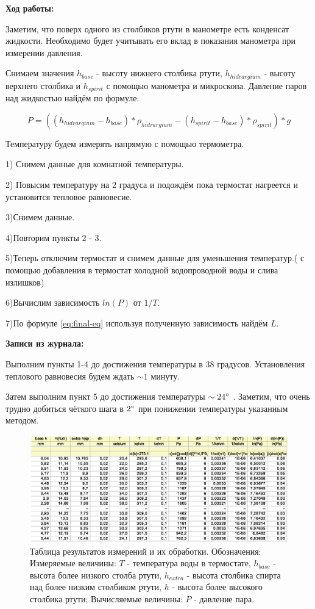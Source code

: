 \documentclass[a4paper,12pt]{article}
\begin{document}
\textbf{Ход работы:}
\bigskip

Заметим, что поверх одного из столбиков ртути в манометре есть конденсат жидкости. Необходимо будет учитывать его вклад в показания манометра при измерении давления.

Снимаем значения $h_{base}$ - высоту нижнего столбика ртути, $h_{hidrargium}$ - высоту верхнего столбика  и $h_{spirit}$ с помощью манометра и микроскопа. Давление паров над жидкостью найдём по формуле: 

\begin{equation}\label{eq:p-from-h}
P = ((h_{hidrargium} - h_{base})*\rho_{hidrargium} - (h_{spirit} - h_{base})*\rho_{spirit})*g
\end{equation}

Температуру будем измерять напрямую с помощью термометра.
\medskip

1) Снимем данные для комнатной температуры.

2) Повысим температуру на 2 градуса и подождём пока термостат нагреется и установится тепловое равновесие.

3)Снимем данные.

4)Повторим пункты 2 - 3.

5)Теперь отключим термостат и снимем данные для уменьшения температур.( с помощью добавления в термостат холодной водопроводной воды и слива излишков)

6)Вычислим зависимость $ln(P)$ от $1/T$.

7)По формуле \ref{eq:final-eq} используя полученную зависимость найдём $L$.
\bigskip

\textbf{Записи из журнала:}
\bigskip

Выполним пункты 1-4 до достижения температуры в 38 градусов. Установления теплового равновесия будем ждать $ \sim 1 $ минуту.

Затем выполним пункт 5 до достижения температуры $ \sim24\degree $ . Заметим, что очень трудно добиться чёткого шага в $ 2\degree $ при понижении температуры указанным методом.


\begin{figure}[ht]
\centering
\includegraphics[width=170mm]{table.eps}
\caption{Таблица результатов измерений и их обработки. Обозначения: Измеряемые величины: $ T $ - температура воды в термостате, $ h_{base} $ - высота более низкого столба ртути, $ h_{extra} $ - высота столбика спирта над более низким столбиком ртути, $ h $ - высота более высокого столбика ртути; Вычисляемые величины: $ P $ - давление пара. }\label{lab_table}
\end{figure}
\end{document}
